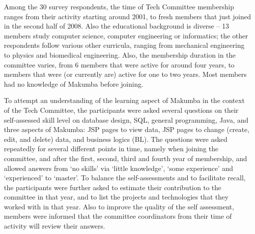 \documentclass{chi2009}
\begin{document}
Among the 30 survey respondents, the 
time of Tech Committee membership ranges from their activity starting around 2001, to fresh members that just joined in the second half of 2008. Also the educational background is diverse -- 13 members study computer science, computer engineering or informatics; the other respondents follow various other curricula, ranging from mechanical engineering to physics and biomedical engineering. Also, the membership duration in the committee varies, from 6 members that were active for around four years, to members that were (or currently are) active for one to two years. Most members had no knowledge of Makumba before joining.

To attempt an understanding of the learning aspect of Makumba in the context of the Tech Committee, the participants were asked several questions on their self-assessed skill level on database design, SQL, general programming, Java, and three aspects of Makumba: JSP pages to view data, JSP pages to change (create, edit, and delete) data, and business logics (BL). The questions were asked repeatedly for several different points in time, namely when joining the committee, and after the first, second, third and fourth year of membership, and allowed answers from `no skills' via `little knowledge', `some experience' and `experienced' to `master'. To balance the self-assessments and to facilitate recall, the participants were further asked to estimate their contribution to the committee in that year, and to list the projects and technologies that they worked with in that year. Also to improve the quality of the self assessment, members were informed that the committee coordinators from their time of activity will review their answers.
\end{document}

